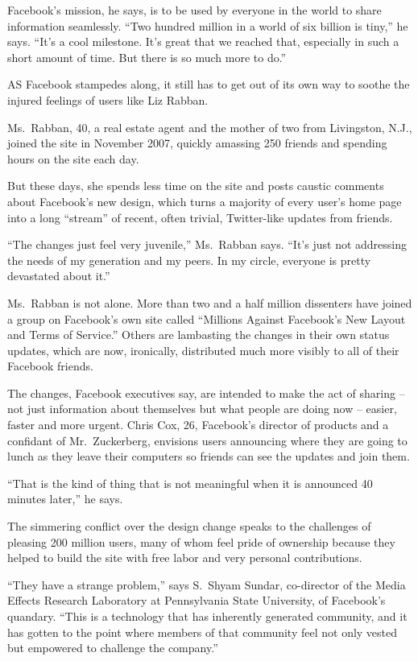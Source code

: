 \documentclass[12pt,a4paper,onecolumn]{article}
\begin{document}
Facebook's mission, he says, is to be used by everyone in the world to share information seamlessly.
``Two hundred million in a world of six billion is tiny,'' he says. ``It's a cool milestone. It's
great that we reached that, especially in such a short amount of time. But there is so much more to
do.''

AS Facebook stampedes along, it still has to get out of its own way to soothe the injured feelings
of users like Liz Rabban.

Ms.~Rabban, 40, a real estate agent and the mother of two from Livingston, N.J., joined the site in
November 2007, quickly amassing 250 friends and spending hours on the site each day.

But these days, she spends less time on the site and posts caustic comments about Facebook's new
design, which turns a majority of every user's home page into a long ``stream'' of recent, often
trivial, Twitter-like updates from friends.

``The changes just feel very juvenile,'' Ms.~Rabban says. ``It's just not addressing the needs of my
generation and my peers. In my circle, everyone is pretty devastated about it.''

Ms.~Rabban is not alone. More than two and a half million dissenters have joined a group on
Facebook's own site called ``Millions Against Facebook's New Layout and Terms of Service.'' Others
are lambasting the changes in their own status updates, which are now, ironically, distributed much
more visibly to all of their Facebook friends.

The changes, Facebook executives say, are intended to make the act of sharing -- not just
information about themselves but what people are doing now -- easier, faster and more urgent. Chris
Cox, 26, Facebook's director of products and a confidant of Mr.~Zuckerberg, envisions users
announcing where they are going to lunch as they leave their computers so friends can see the
updates and join them.

``That is the kind of thing that is not meaningful when it is announced 40 minutes later,'' he says.

The simmering conflict over the design change speaks to the challenges of pleasing 200 million
users, many of whom feel pride of ownership because they helped to build the site with free labor
and very personal contributions.

``They have a strange problem,'' says S.~Shyam Sundar, co-director of the Media Effects Research
Laboratory at Pennsylvania State University, of Facebook's quandary. ``This is a technology that has
inherently generated community, and it has gotten to the point where members of that community feel
not only vested but empowered to challenge the company.''
\end{document}
